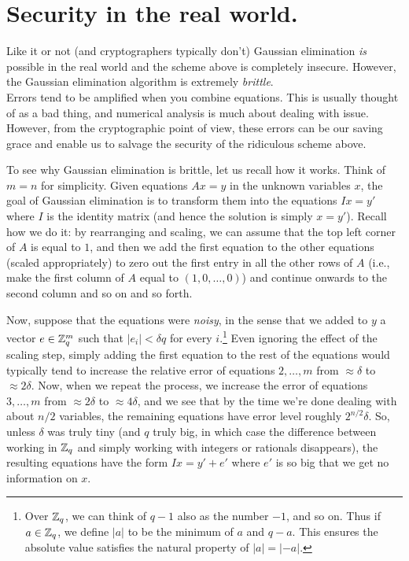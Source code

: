 \section{Security in the real world.}\label{Security-in-the-real-worl}

Like it or not (and cryptographers typically don't) Gaussian elimination
\emph{is} possible in the real world and the scheme above is completely
insecure. However, the Gaussian elimination algorithm is extremely
\emph{brittle}.\\
Errors tend to be amplified when you combine equations. This is usually
thought of as a bad thing, and numerical analysis is much about dealing
with issue. However, from the cryptographic point of view, these errors
can be our saving grace and enable us to salvage the security of the
ridiculous scheme above.

To see why Gaussian elimination is brittle, let us recall how it works.
Think of \(m=n\) for simplicity. Given equations \(Ax=y\) in the unknown
variables \(x\), the goal of Gaussian elimination is to transform them
into the equations \(Ix = y'\) where \(I\) is the identity matrix (and
hence the solution is simply \(x=y'\)). Recall how we do it: by
rearranging and scaling, we can assume that the top left corner of \(A\)
is equal to \(1\), and then we add the first equation to the other
equations (scaled appropriately) to zero out the first entry in all the
other rows of \(A\) (i.e., make the first column of \(A\) equal to
\((1,0,\ldots,0)\)) and continue onwards to the second column and so on
and so forth.

Now, suppose that the equations were \emph{noisy}, in the sense that we
added to \(y\) a vector \(e\in{\mathbb{Z}}_q^m\) such that \(|e_i|<\delta q\) for
every \(i\).\footnote{Over \({\mathbb{Z}}_q\), we can think of \(q-1\) also as the
  number \(-1\), and so on. Thus if \(a\in{\mathbb{Z}}_q\), we define \(|a|\) to
  be the minimum of \(a\) and \(q-a\). This ensures the absolute value
  satisfies the natural property of \(|a|=|-a|\).} Even ignoring the
effect of the scaling step, simply adding the first equation to the rest
of the equations would typically tend to increase the relative error of
equations \(2,\ldots,m\) from \(\approx \delta\) to \(\approx 2\delta\).
Now, when we repeat the process, we increase the error of equations
\(3,\ldots,m\) from \(\approx 2\delta\) to \(\approx 4\delta\), and we
see that by the time we're done dealing with about \(n/2\) variables,
the remaining equations have error level roughly \(2^{n/2}\delta\). So,
unless \(\delta\) was truly tiny (and \(q\) truly big, in which case the
difference between working in \({\mathbb{Z}}_q\) and simply working with integers
or rationals disappears), the resulting equations have the form
\(Ix = y' + e'\) where \(e'\) is so big that we get no information on
\(x\).


